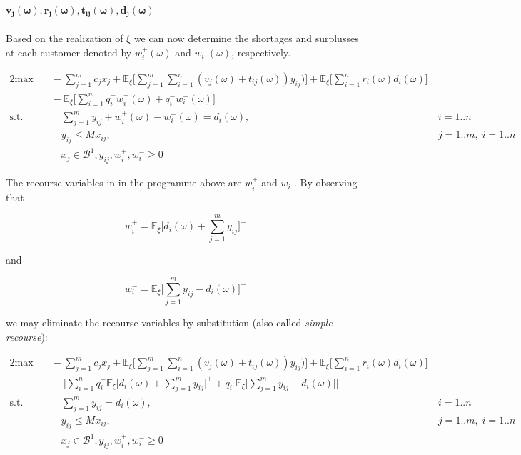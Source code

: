 \obs\\

$\bm{v_j(\omega), r_j(\omega), t_{ij}(\omega),d_j(\omega)}$\\

\sttwo\\

Based on the realization of $\xi$ we can now determine the shortages
and surplusses at each customer denoted by $w_i^+(\omega)$ and $w_i^-(\omega)$,
respectively.\\

\form

\begin{alignat*}{2}
\textrm{max}  & \quad  -\sum_{j=1}^m c_j x_j + \mathbb{E}_\xi \Big[\sum_{j=1}^{m} \sum_{i=1}^{n} (v_j(\omega) + t_{ij}(\omega))y_{ij})\Big] + \mathbb{E}_\xi \Big[\sum_{i=1}^n r_i(\omega)d_i(\omega)\Big]\ \\
 & \quad - \mathbb{E}_\xi \Big[\sum_{i=1}^n q_i^+ w_i^+(\omega) + q_i^- w_i^-(\omega)\Big]\ \\
\text{s.t.} & \quad \quad \sum_{j=1}^m y_{ij} + w_i^+(\omega) - w_i^-(\omega) = d_i(\omega),\ & i = 1..n\ \\
            & \quad \quad y_{ij} \leq M x_{ij}, & j=1..m, \; i = 1..n \ \\
            & \quad \quad x_j \in \mathcal{B}^1, y_{ij}, w_i^+, w_i^- \geq 0 & \
\end{alignat*}

The recourse variables in in the programme above are $w_i^+$ and $w_i^-$. By observing that 

\[
w_i^+ = \mathbb{E}_\xi \Big[ d_i(\omega) + \sum_{j=1}^m y_{ij} \Big]^+
\]

and

\[
w_i^- = \mathbb{E}_\xi \Big[\sum_{j=1}^m y_{ij} - d_i(\omega) \Big]^+
\]

we may eliminate the recourse variables by substitution (also called \emph{simple recourse}):

\begin{alignat*}{2}
\textrm{max}  & \quad  -\sum_{j=1}^m c_j x_j + \mathbb{E}_\xi \Big[\sum_{j=1}^{m} \sum_{i=1}^{n} (v_j(\omega) + t_{ij}(\omega))y_{ij})\Big] + \mathbb{E}_\xi \Big[\sum_{i=1}^n r_i(\omega)d_i(\omega)\Big]\ \\
 & \quad - \Big[\sum_{i=1}^n q_i^+ \mathbb{E}_\xi \Big[ d_i(\omega) + \sum_{j=1}^m y_{ij} \Big]^+ + q_i^- \mathbb{E}_\xi \Big[\sum_{j=1}^m y_{ij} - d_i(\omega) \Big] \Big]\ \\
\text{s.t.} & \quad \quad \sum_{j=1}^m y_{ij} = d_i(\omega),\ & i = 1..n\ \\
            & \quad \quad y_{ij} \leq M x_{ij}, & j=1..m, \; i = 1..n \ \\
            & \quad \quad x_j \in \mathcal{B}^1, y_{ij}, w_i^+, w_i^- \geq 0 & \
\end{alignat*}

